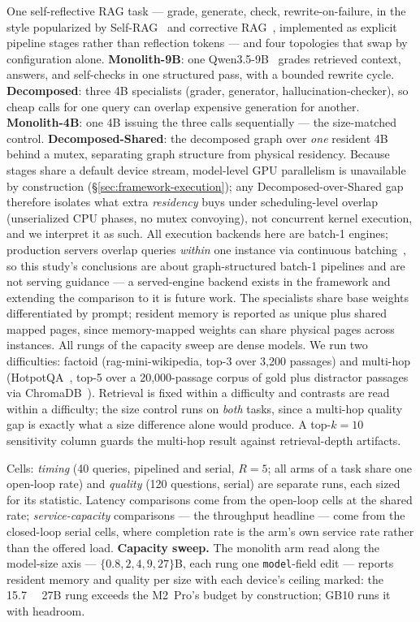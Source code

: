 One self-reflective RAG task --- grade, generate, check, rewrite-on-failure,
in the style popularized by Self-RAG~\cite{asai2024selfrag} and corrective
RAG~\cite{yan2024crag}, implemented as explicit pipeline stages rather than
reflection tokens --- and four topologies that swap by configuration
alone. \textbf{Monolith-9B}: one Qwen3.5-9B~\cite{qwen35}
grades retrieved context, answers, and self-checks in one structured pass,
with a bounded rewrite cycle. \textbf{Decomposed}: three 4B specialists
(grader, generator, hallucination-checker), so cheap calls for one query
can overlap expensive generation for another. \textbf{Monolith-4B}: one 4B
issuing the three calls sequentially --- the size-matched control.
\textbf{Decomposed-Shared}: the decomposed graph over \emph{one} resident
4B behind a mutex, separating graph structure from physical residency.
Because stages share a default device stream, model-level GPU parallelism
is unavailable by construction (\S\ref{sec:framework-execution}); any
Decomposed-over-Shared gap therefore isolates what extra \emph{residency}
buys under scheduling-level overlap (unserialized CPU phases, no mutex
convoying), not concurrent kernel execution, and we interpret it as such.
All execution backends here are batch-1 engines; production servers
overlap queries \emph{within} one instance via continuous
batching~\cite{yu2022orca,kwon2023vllm}, so this study's conclusions are
about graph-structured batch-1 pipelines and are not serving guidance ---
a served-engine backend exists in the framework and extending the
comparison to it is future work.
The specialists share base weights differentiated by prompt; resident
memory is reported as unique plus shared mapped pages, since memory-mapped
weights can share physical pages across instances. All rungs of the
capacity sweep are dense models.
We run two difficulties: factoid (rag-mini-wikipedia, top-3 over 3{,}200 passages) and multi-hop (HotpotQA~\cite{yang2018hotpotqa}, top-5 over a 20{,}000-passage corpus of gold plus distractor passages via ChromaDB~\cite{chroma}). Retrieval is fixed within a difficulty and contrasts are read within a difficulty; the size control runs on \emph{both} tasks, since a multi-hop
quality gap is exactly what a size difference alone would produce. A
top-$k{=}10$ sensitivity column guards the multi-hop result against
retrieval-depth artifacts.

Cells: \emph{timing} (40 queries, pipelined and serial, $R{=}5$; all arms
of a task share one open-loop rate) and \emph{quality} (120 questions,
serial) are separate runs, each sized for its statistic. Latency
comparisons come from the open-loop cells at the shared rate;
\emph{service-capacity} comparisons --- the throughput headline --- come
from the closed-loop serial cells, where completion rate is the arm's own
service rate rather than the offered load. \textbf{Capacity sweep.} The
monolith arm read along the model-size axis --- $\{0.8, 2, 4, 9, 27\}$B,
each rung one \texttt{model}-field edit --- reports resident memory and
quality per size with each device's ceiling marked: the
\SI{15.7}{\giga\byte} 27B rung exceeds the M2~Pro's budget by
construction; GB10 runs it with headroom.

